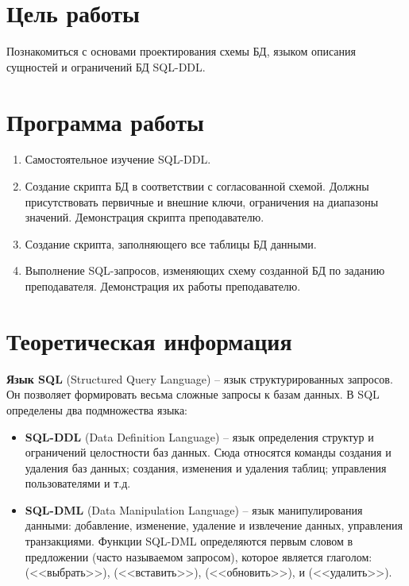 





\tableofcontents
\newpage

\section{Цель работы}

Познакомиться с основами проектирования схемы БД, языком описания сущностей и ограничений БД SQL-DDL.

\section{Программа работы}

\begin{enumerate}
	\item Самостоятельное изучение SQL-DDL.
	\item Создание скрипта БД в соответствии с согласованной схемой. Должны присутствовать первичные и внешние ключи, ограничения на диапазоны значений. Демонстрация скрипта преподавателю. 
	\item Создание скрипта, заполняющего все таблицы БД данными.
	\item Выполнение SQL-запросов, изменяющих схему созданной БД по заданию преподавателя. Демонстрация их работы преподавателю.
\end{enumerate}

\section{Теоретическая информация}

\textbf{Язык SQL} (Structured Query Language) -- язык структурированных запросов. Он позволяет формировать весьма сложные запросы к базам данных. В SQL определены два подмножества языка:
\begin{itemize}
	\item \textbf{SQL-DDL} (Data Definition Language) -- язык определения структур и ограничений целостности баз данных. Сюда относятся команды создания и удаления баз данных; создания, изменения и удаления таблиц; управления пользователями и т.д.
	\item \textbf{SQL-DML} (Data Manipulation Language) -- язык манипулирования данными: добавление, изменение, удаление и извлечение данных, управления транзакциями. Функции SQL-DML определяются первым словом в предложении (часто называемом запросом), которое является глаголом:  (<<выбрать>>),  (<<вставить>>),  (<<обновить>>), и  (<<удалить>>). 
\end{itemize}

